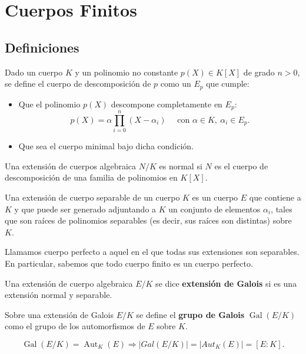 \section{Cuerpos Finitos}
\label{sec:finitos}

\subsection{Definiciones}
\begin{dfn}
	Dado un cuerpo $K$ y un polinomio no constante $p(X) \in K[X]$ de grado $n > 0$, se define el cuerpo de descomposición de $p$ como un $E_p$ que cumple:
	\begin{itemize}
		\item Que el polinomio $p(X)$ descompone completamente en $E_p$:
		$$p(X) = \alpha \prod\limits_{i=0}^n \left(X-\alpha_i\right) \quad \text{ con } \alpha \in K, \ \alpha_i \in E_p.$$
		\item Que sea el cuerpo minimal bajo dicha condición.
	\end{itemize}
\end{dfn}

\begin{dfn}
	Una extensión de cuerpos algebraica $N/K$ es normal si $N$ es el cuerpo de descomposición de una familia de polinomios en $K[X]$.
\end{dfn}

\begin{dfn}
	Una extensión de cuerpo separable de un cuerpo $K$ es un cuerpo $E$ que contiene a $K$ y que puede ser generado adjuntando a $K$ un conjunto de elementos $\alpha_i$, tales que son raíces de polinomios separables (es decir, sus raíces son distintas) sobre $K$.
\end{dfn}
	
\begin{dfn}
	Llamamos cuerpo perfecto a aquel en el que todas sus extensiones son separables. En particular, sabemos que todo cuerpo finito es un cuerpo perfecto.
\end{dfn}

\begin{dfn}
	Una extensión de cuerpo algebraica $E/K$ se dice \textbf{extensión de Galois} si es una extensión normal y separable.
\end{dfn}

\begin{dfn}
	Sobre una extensión de Galois $E/K$ se define el \textbf{grupo de Galois} $\operatorname{Gal}(E/K)$ como el grupo de los automorfismos de $E$ sobre $K$.
	
	$$\operatorname{Gal}(E/K) = \operatorname{Aut}_K(E) \Rightarrow |Gal(E/K)| = |Aut_K(E)| = [E: K].$$
\end{dfn}

